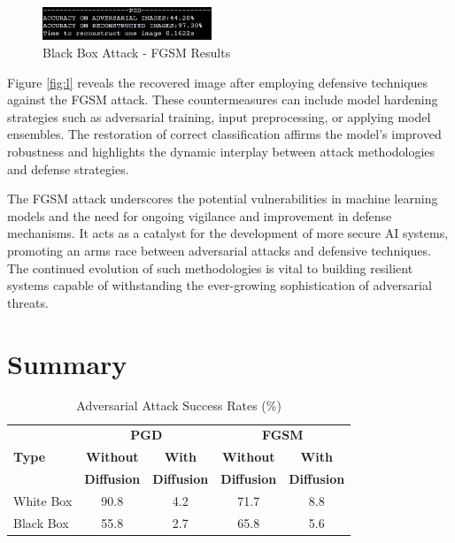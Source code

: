 \documentclass[letterpaper,twocolumn,10pt]{article}
\begin{document}
\begin{figure}[htbp]
  \centering
  \includegraphics[width=0.45\textwidth]{bpgd.png}
  \caption{Black Box Attack - FGSM Results}
  \label{fig:bpgd}
\end{figure}

Figure \ref{fig:l} reveals the recovered image after employing defensive techniques against the FGSM attack. These countermeasures can include model hardening strategies such as adversarial training, input preprocessing, or applying model ensembles. The restoration of correct classification affirms the model's improved robustness and highlights the dynamic interplay between attack methodologies and defense strategies.

The FGSM attack underscores the potential vulnerabilities in machine learning models and the need for ongoing vigilance and improvement in defense mechanisms. It acts as a catalyst for the development of more secure AI systems, promoting an arms race between adversarial attacks and defensive techniques. The continued evolution of such methodologies is vital to building resilient systems capable of withstanding the ever-growing sophistication of adversarial threats.

\section{Summary}
\begin{table}[ht]
	\centering
	\label{tab:attack_performance}
	{\small %
	\begin{tabular}{|l|c|c|c|c|}
		\hline
		& \multicolumn{2}{c|}{\textbf{PGD}} & \multicolumn{2}{c|}{\textbf{FGSM}} \\ \cline{2-5} 
		\textbf{Type} & \textbf{Without} & \textbf{With} & \textbf{Without} & \textbf{With} \\ 
		& \textbf{Diffusion} & \textbf{Diffusion} & \textbf{Diffusion} & \textbf{Diffusion} \\ \hline
		White Box & 90.8 & 4.2 & 71.7 & 8.8 \\ \hline
		Black Box & 55.8 & 2.7 & 65.8 & 5.6 \\ \hline
	\end{tabular}
    \caption{Adversarial Attack Success Rates (\%)}
	}
\end{table}
\end{document}
